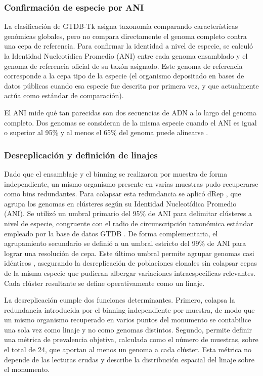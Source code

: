 \subsubsection{Confirmación de especie por ANI}

La clasificación de GTDB-Tk asigna taxonomía comparando características genómicas globales, pero no compara directamente el genoma completo contra una cepa de referencia. Para confirmar la identidad a nivel de especie, se calculó la Identidad Nucleotídica Promedio (ANI) entre cada genoma ensamblado y el genoma de referencia oficial de su taxón asignado. Este genoma de referencia corresponde a la cepa tipo de la especie (el organismo depositado en bases de datos públicas cuando esa especie fue descrita por primera vez, y que actualmente actúa como estándar de comparación).

El ANI mide qué tan parecidas son dos secuencias de ADN a lo largo del genoma completo. Dos genomas se consideran de la misma especie cuando el ANI es igual o superior al 95\% y al menos el 65\% del genoma puede alinearse \cite{fastANI2018, gtdbtk2019}.

\subsubsection{Desreplicación y definición de linajes}

Dado que el ensamblaje y el binning se realizaron por muestra de forma independiente, un mismo organismo presente en varias muestras pudo recuperarse como bins redundantes. Para colapsar esta redundancia se aplicó dRep  \cite{olm2017}, que agrupa los genomas en clústeres según su Identidad Nucleotídica Promedio (ANI). Se utilizó un umbral primario del 95\% de ANI para delimitar clústeres a nivel de especie, congruente con el radio de circunscripción taxonómica estándar empleado por la base de datos GTDB \cite{gtdbtk2019}. De forma complementaria, el agrupamiento secundario se definió a un umbral estricto del 99\% de ANI para lograr una resolución de cepa. Este último umbral permite agrupar genomas casi idénticos \cite{olm2017}, asegurando la desreplicación de poblaciones clonales sin colapsar cepas de la misma especie que pudieran albergar variaciones intraespecíficas relevantes. Cada clúster resultante se define operativamente como un linaje.

La desreplicación cumple dos funciones determinantes. Primero, colapsa la redundancia introducida por el binning independiente por muestra, de modo que un mismo organismo recuperado en varios puntos del monumento se contabilice una sola vez como linaje y no como genomas distintos. Segundo, permite definir una métrica de prevalencia objetiva, calculada como el número de muestras, sobre el total de 24, que aportan al menos un genoma a cada clúster. Esta métrica no depende de las lecturas crudas y describe la distribución espacial del linaje sobre el monumento.

